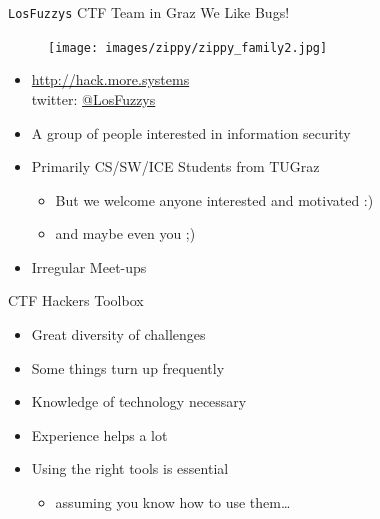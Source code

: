 \begin{frame}[allowframebreaks]
  {\texttt{LosFuzzys} CTF Team in Graz}
  {We Like Bugs!}

  \begin{figure}[H]
    \centering
    \texttt{[image: images/zippy/zippy\_family2.jpg]}
  \end{figure}

  \framebreak

  \begin{itemize}
    \item \url{http://hack.more.systems}
      \\ twitter: \href{https://twitter.com/LosFuzzys}{@LosFuzzys}
    \item A group of people interested in information security
    \item Primarily CS/SW/ICE Students from TUGraz
      \begin{itemize}
        \item But we welcome anyone interested and motivated :)
        \item and maybe even you ;)
      \end{itemize}
    \item Irregular Meet-ups
  \end{itemize}
\end{frame}

\begin{frame}
  {CTF Hackers Toolbox}

  \begin{itemize}
    \item Great diversity of challenges
    \item Some things turn up frequently
    \item Knowledge of technology necessary
    \item Experience helps a lot
  \end{itemize}

  \begin{itemize}
    \item Using the right tools is essential
      \begin{itemize}
        \item assuming you know how to use them\ldots
      \end{itemize}
  \end{itemize}

\end{frame}

